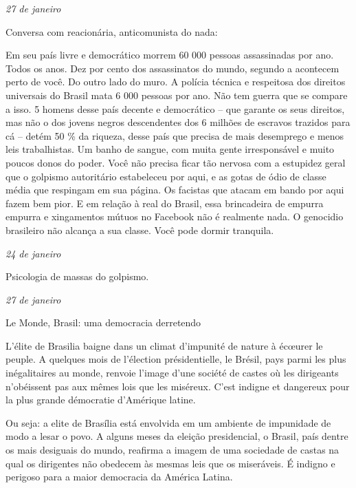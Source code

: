 \begin{flushright}
\emph{27 de janeiro}
\end{flushright}

Conversa com reacionária, anticomunista do nada:

Em seu país livre e democrático morrem 60 000 pessoas assassinadas por
ano. Todos os anos. Dez por cento dos assassinatos do mundo, segundo a
 acontecem perto de você. Do outro lado do muro. A polícia técnica e
respeitosa dos direitos universais do Brasil mata 6 000 pessoas por ano.
Não tem guerra que se compare a isso. 5 homens desse país decente e
democrático -- que garante os seus direitos, mas não o dos jovens negros
descendentes dos 6 milhões de escravos trazidos para cá -- detém 50 \% da
riqueza, desse país que precisa de mais desemprego e menos leis
trabalhistas. Um banho de sangue, com muita gente irresponsável e muito
poucos donos do poder. Você não precisa ficar tão nervosa com a
estupidez geral que o golpismo autoritário estabeleceu por aqui, e as
gotas de ódio de classe média que respingam em sua página. Os facistas
que atacam em bando por aqui fazem bem pior. E em relação à real do
Brasil, essa brincadeira de empurra empurra e xingamentos mútuos no Facebook
não é realmente nada. O genocidio brasileiro não alcança a sua
classe. Você pode dormir tranquila.

\begin{flushright}
\emph{24 de janeiro}
\end{flushright}

Psicologia de massas do golpismo.

\begin{flushright}
\emph{27 de janeiro}
\end{flushright}

Le Monde, Brasil: uma democracia derretendo

L'élite de Brasilia baigne dans un climat d'impunité de nature à écœurer
le peuple. A quelques mois de l'élection présidentielle, le Brésil, pays
parmi les plus inégalitaires au monde, renvoie l'image d'une société de
castes où les dirigeants n'obéissent pas aux mêmes lois que les
miséreux. C'est indigne et dangereux pour la plus grande démocratie
d'Amérique latine.

Ou seja: a elite de Brasília está envolvida em um ambiente de impunidade
de modo a lesar o povo. A alguns meses da eleição presidencial, o
Brasil, país dentre os mais desiguais do mundo, reafirma a imagem de uma
sociedade de castas na qual os dirigentes não obedecem às mesmas leis
que os miseráveis. É indigno e perigoso para a maior democracia da
América Latina.

